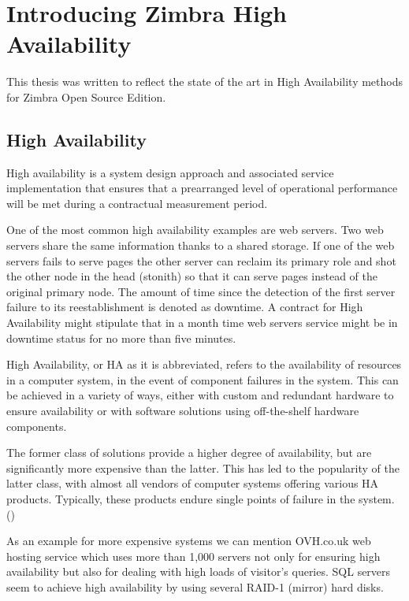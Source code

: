 

\chapter{Introducing Zimbra High Availability}
This thesis was written to reflect the state of the art in High Availability methods for Zimbra Open Source Edition.  

\section {High Availability}
High availability is a system design approach and associated service implementation that ensures that a prearranged level of operational performance will be met during a contractual measurement period.

One of the most common high availability examples are web servers. Two web servers share the same information thanks to a shared storage. If one of the web servers fails to serve pages the other server can reclaim its primary role and shot the other node in the head (stonith) so that it can serve pages instead of the original primary node. The amount of time since the detection of the first server failure to its reestablishment is denoted as downtime. A contract for High Availability might stipulate that in a month time web servers service might be in downtime status for no more than five minutes.

High Availability, or HA as it is abbreviated, refers to the availability of resources in a computer system, in the event of component failures in the system. This can be achieved in a variety of ways, either with custom and redundant hardware to ensure availability or with software solutions using off-the-shelf hardware components.

The former class of solutions provide a higher degree of availability, but are significantly more expensive than the latter. This has led to the popularity of the latter class, with almost all vendors of computer systems offering various HA products. Typically, these products endure single points of failure in the system. (\cite{TaskForceHA})

As an example for more expensive systems we can mention OVH.co.uk web hosting service which uses more than 1,000 servers not only for ensuring high availability but also for dealing with high loads of visitor's queries. SQL servers seem to achieve high availability by using several RAID-1 (mirror) hard disks.

